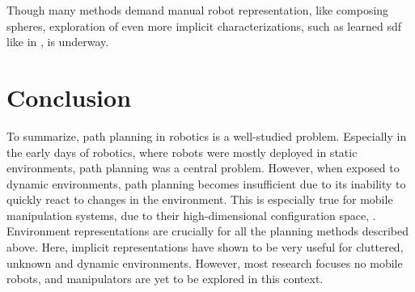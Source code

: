 Though many methods demand manual robot representation, like
composing spheres, exploration of even more implicit
characterizations, such as learned \ac{sdf} like in
\cite{Liu2022regularized,Koptev2023neural}, is underway.

\section{Conclusion}
\label{sec:state_conclusion}

To summarize, path planning in robotics is a well-studied
problem. Especially in the early days of robotics, where
robots were mostly deployed in static environments, path
planning was a central problem. However, when exposed to
dynamic environments, path planning becomes insufficient due
to its inability to quickly react to changes in the
environment. This is especially true for mobile manipulation
systems, due to their high-dimensional configuration space,
\cite{Avanzini2018}. Environment representations are
crucially for all the planning methods described above.
Here, implicit representations have shown to be very useful
for cluttered, unknown and dynamic environments. However,
most research focuses no mobile robots, and manipulators
are yet to be explored in this context.


